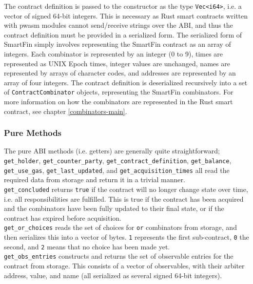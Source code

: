 The contract definition is passed to the constructor as the type \texttt{Vec<i64>}, i.e. a vector of signed 64-bit integers. This is necessary as Rust smart contracts written with pwasm modules cannot send/receive strings over the ABI, and thus the contract definition must be provided in a serialized form. The serialized form of SmartFin simply involves representing the SmartFin contract as an array of integers. Each combinator is represented by an integer (0 to 9), times are represented as UNIX Epoch times, integer values are unchanged, names are represented by arrays of character codes, and addresses are represented by an array of four integers. The contract definition is deserialized recursively into a set of \texttt{ContractCombinator} objects, representing the SmartFin combinators. For more information on how the combinators are represented in the Rust smart contract, see chapter \ref{combinators-main}.


\subsubsection{Pure Methods} \label{ABI-pure}

The pure ABI methods (i.e. getters) are generally quite straightforward; \texttt{get\_holder}, \texttt{get\-\_counter\_party}, \texttt{get\_contract\_definition}, \texttt{get\_balance}, \texttt{get\_use\_gas}, \texttt{get\_last\_updated}, and \texttt{get\_acquisition\_times} all read the required data from storage and return it in a trivial manner. \\

\texttt{get\_concluded} returns \texttt{true} if the contract will no longer change state over time, i.e. all responsibilities are fulfilled. This is true if the contract has been acquired and the combinators have been fully updated to their final state, or if the contract has expired before acquisition. \\

\texttt{get\_or\_choices} reads the set of choices for \texttt{or} combinators from storage, and then serializes this into a vector of bytes. \texttt{1} represents the first sub-contract, \texttt{0} the second, and \texttt{2} means that no choice has been made yet. \\

\texttt{get\_obs\_entries} constructs and returns the set of observable entries for the contract from storage. This consists of a vector of observables, with their arbiter address, value, and name (all serialized as several signed 64-bit integers).


